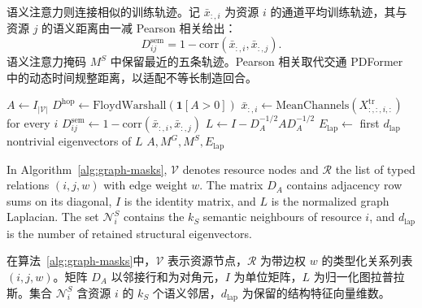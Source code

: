 \documentclass[a4paper,fleqn]{cas-dc}
\newcommand{\zhpara}[1]{%
  \par\begingroup\small\color{black!72}\noindent #1\par\endgroup}
\begin{document}
\zhpara{语义注意力则连接相似的训练轨迹。记 $\bar x_{:,i}$ 为资源 $i$ 的通道平均训练轨迹，其与资源 $j$ 的语义距离由一减 Pearson 相关给出：
\begin{equation}
D^{\mathrm{sem}}_{ij}
=1-\mathrm{corr}(\bar{x}_{:,i},\bar{x}_{:,j}).
\end{equation}
语义注意力掩码 $M^S$ 中保留最近的五条轨迹。Pearson 相关取代交通 PDFormer 中的动态时间规整距离，以适配不等长制造回合。}


\begin{algorithm}[t]
\caption{Factory graph and attention-mask construction.}
\label{alg:graph-masks}
$A\leftarrow I_{|\mathcal{V}|}$\;
$D^{\mathrm{hop}}\leftarrow\mathrm{FloydWarshall}(\mathbf{1}[A>0])$\;
$\bar x_{:,i}\leftarrow\mathrm{MeanChannels}(X^{\mathrm{tr}}_{:,:,i,:})$ for every $i$\;
$D^{\mathrm{sem}}_{ij}\leftarrow1-\mathrm{corr}(\bar x_{:,i},\bar x_{:,j})$\;
$L\leftarrow I-D_A^{-1/2}AD_A^{-1/2}$\;
$E_{\mathrm{lap}}\leftarrow$ first $d_{\mathrm{lap}}$ nontrivial eigenvectors of $L$\;
\Return $A,M^G,M^S,E_{\mathrm{lap}}$\;
\end{algorithm}

In Algorithm~\ref{alg:graph-masks}, $\mathcal{V}$ denotes resource nodes and $\mathcal{R}$ the list of typed relations $(i,j,w)$ with edge weight $w$. The matrix $D_A$ contains adjacency row sums on its diagonal, $I$ is the identity matrix, and $L$ is the normalized graph Laplacian. The set $\mathcal{N}^{S}_i$ contains the $k_S$ semantic neighbours of resource $i$, and $d_{\mathrm{lap}}$ is the number of retained structural eigenvectors.

\zhpara{在算法~\ref{alg:graph-masks}中，$\mathcal{V}$ 表示资源节点，$\mathcal{R}$ 为带边权 $w$ 的类型化关系列表 $(i,j,w)$。矩阵 $D_A$ 以邻接行和为对角元，$I$ 为单位矩阵，$L$ 为归一化图拉普拉斯。集合 $\mathcal{N}^{S}_i$ 含资源 $i$ 的 $k_S$ 个语义邻居，$d_{\mathrm{lap}}$ 为保留的结构特征向量维数。}
\end{document}
